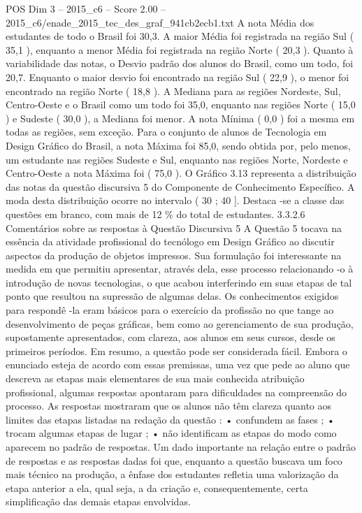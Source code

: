 \begin{textsample}{POS Dim 3 – 2015\_c6 – Score 2.00 – 2015\_c6/enade\_2015\_tec\_des\_graf\_941cb2ecb1.txt}
A nota Média dos estudantes de todo o Brasil foi 30,3.
A maior Média foi registrada na região Sul ( 35,1 ), enquanto a menor Média foi registrada na região Norte ( 20,3 ).
Quanto à variabilidade das notas, o Desvio padrão dos alunos do Brasil, como um todo, foi 20,7.
Enquanto o maior desvio foi encontrado na região Sul ( 22,9 ), o menor foi encontrado na região Norte ( 18,8 ).
A Mediana para as regiões Nordeste, Sul, Centro-Oeste e o Brasil como um todo foi 35,0, enquanto nas regiões Norte ( 15,0 ) e Sudeste ( 30,0 ), a Mediana foi menor.
A nota Mínima ( 0,0 ) foi a mesma em todas as regiões, sem exceção.
Para o conjunto de alunos de Tecnologia em Design Gráfico do Brasil, a nota Máxima foi 85,0, sendo obtida por, pelo menos, um estudante nas regiões Sudeste e Sul, enquanto nas regiões Norte, Nordeste e Centro-Oeste a nota Máxima foi ( 75,0 ).
O Gráfico 3.13 representa a distribuição das notas da questão discursiva 5 do Componente de Conhecimento Específico.
A moda desta distribuição ocorre no intervalo ( 30 ; 40 ].
Destaca -se a classe das questões em branco, com mais de 12 \% do total de estudantes. 3.3.2.6 Comentários sobre as respostas à Questão Discursiva 5 A Questão 5 tocava na essência da atividade profissional do tecnólogo em Design Gráfico ao discutir aspectos da produção de objetos impressos.
Sua formulação foi interessante na medida em que permitiu apresentar, através dela, esse processo relacionando -o à introdução de novas tecnologias, o que acabou interferindo em suas etapas de tal ponto que resultou na supressão de algumas delas.
Os conhecimentos exigidos para respondê -la eram básicos para o exercício da profissão no que tange ao desenvolvimento de peças gráficas, bem como ao gerenciamento de sua produção, supostamente apresentados, com clareza, aos alunos em seus cursos, desde os primeiros períodos.
Em resumo, a questão pode ser considerada fácil.
Embora o enunciado esteja de acordo com essas premissas, uma vez que pede ao aluno que descreva as etapas mais elementares de sua mais conhecida atribuição profissional, algumas respostas apontaram para dificuldades na compreensão do processo.
As respostas mostraram que os alunos não têm clareza quanto aos limites das etapas listadas na redação da questão : • confundem as fases ; • trocam algumas etapas de lugar ; • não identificam as etapas do modo como aparecem no padrão de respostas.
Um dado importante na relação entre o padrão de respostas e as respostas dadas foi que, enquanto a questão buscava um foco mais técnico na produção, a ênfase dos estudantes refletia uma valorização da etapa anterior a ela, qual seja, a da criação e, consequentemente, certa simplificação das demais etapas envolvidas.

\end{textsample}
